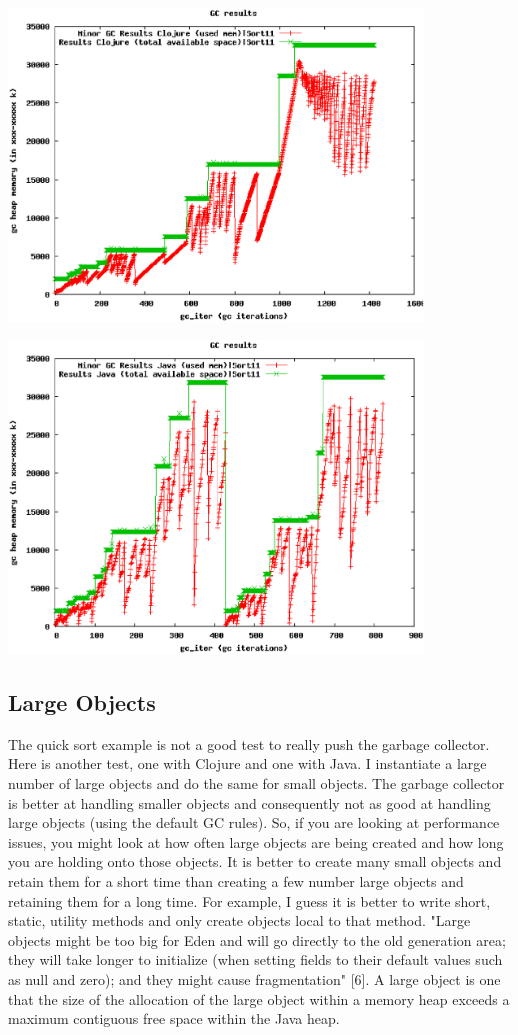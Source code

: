 \includegraphics[width=110mm]{gc_1_11_sort_clj_21.eps}

\includegraphics[width=110mm]{gc_2_java_sort_22.eps}

\subsection{Large Objects}

The quick sort example is not a good test to really push the garbage collector. Here is another test, one with Clojure and one with Java. I instantiate a large number of large objects and do the same for small objects. The garbage collector is better at handling smaller objects and consequently not as good at handling large objects (using the default GC rules). So, if you are looking at performance issues, you might look at how often large objects are being created and how long you are holding onto those objects. It is better to create many small objects and retain them for a short time than creating a few number large objects and retaining them for a long time. For example, I guess it is better to write short, static, utility methods and only create objects local to that method. "Large objects might be too big for Eden and will go directly to the old generation area; they will take longer to initialize (when setting fields to their default values such as null and zero); and they might cause fragmentation" [6]. A large object is one that the size of the allocation of the large object within a memory heap exceeds a maximum contiguous free space within the Java heap.


